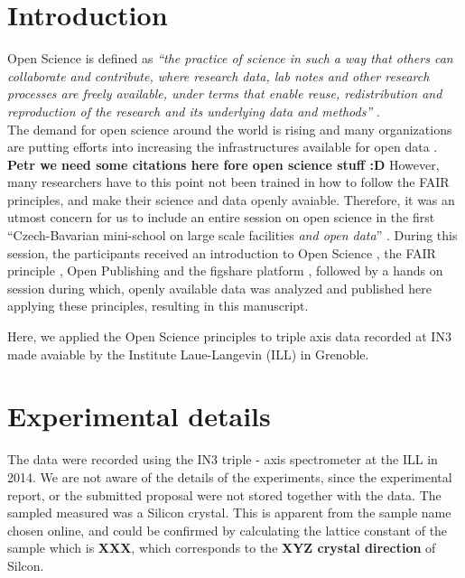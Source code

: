 \documentclass[aps,prx,reprint,amsmath,amssymb,superscriptaddress,showpacs]{revtex4-1}
\begin{document}
\maketitle



\section{Introduction}

Open Science is defined as \emph{``the practice of science in such a way that others can collaborate and contribute, where research data, lab notes and other research processes are freely available, under terms that enable reuse, redistribution and reproduction of the research and its underlying data and methods''} \cite{foster}.\\

The demand for open science around the world is rising and many organizations are putting efforts into increasing the infrastructures available for open data \cite{panosc, nfdi, expands}. \textbf{Petr we need some citations here fore open science stuff :D}
However, many researchers have to this point not been trained in how to follow the FAIR principles, and make their science and data openly avaiable. 
Therefore, it was an utmost concern for us to include an entire session on open science in the first ``Czech-Bavarian mini-school on large scale facilities \emph{and open data}'' \cite{mini-school}.
During this session, the participants received an introduction to Open Science \cite{foster}, the FAIR principle \cite{FAIR}, Open Publishing \cite{arXiv} and the figshare platform \cite{figshare}, followed by a hands on session during which, openly available data was analyzed and published here applying these principles, resulting in this manuscript.
 
Here, we applied the Open Science principles to triple axis data recorded at IN3 \cite{data} made avaiable by the Institute Laue-Langevin (ILL) in Grenoble.

\section{Experimental details}

The data were recorded using the IN3 triple - axis spectrometer \cite{IN3} at the ILL in 2014.
We are not aware of the details of the experiments, since the experimental report, or the submitted proposal were not stored together with the data.
The sampled measured was a Silicon crystal. 
This is apparent from the sample name chosen online, and could be confirmed by calculating the lattice constant of the sample which is \textbf{XXX}, which corresponds to the \textbf{XYZ crystal direction} of Silcon.
\end{document}
